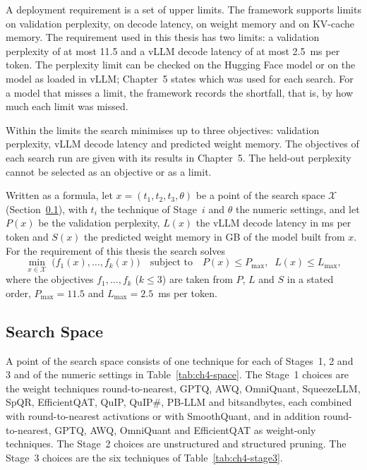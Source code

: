 \documentclass[
11pt, %
english, %
singlespacing, %
headsepline, %
]{MastersDoctoralThesis} %
\begin{document}
A deployment requirement is a set of upper limits. The framework supports limits on validation perplexity, on decode latency, on weight memory and on KV-cache memory. The requirement used in this thesis has two limits: a validation perplexity of at most 11.5 and a vLLM decode latency of at most 2.5~ms per token. The perplexity limit can be checked on the Hugging Face model or on the model as loaded in vLLM; Chapter~5 states which was used for each search. For a model that misses a limit, the framework records the shortfall, that is, by how much each limit was missed.

Within the limits the search minimises up to three objectives: validation perplexity, vLLM decode latency and predicted weight memory. The objectives of each search run are given with its results in Chapter~5. The held-out perplexity cannot be selected as an objective or as a limit.

Written as a formula, let $x = (t_1, t_2, t_3, \theta)$ be a point of the search space $\mathcal{X}$ (Section~\ref{sec:ch4-space}), with $t_i$ the technique of Stage~$i$ and $\theta$ the numeric settings, and let $P(x)$ be the validation perplexity, $L(x)$ the vLLM decode latency in ms per token and $S(x)$ the predicted weight memory in GB of the model built from $x$. For the requirement of this thesis the search solves
\begin{equation}
  \min_{x \in \mathcal{X}} \; \bigl(f_1(x), \ldots, f_k(x)\bigr) \quad \text{subject to} \quad P(x) \le P_{\max}, \;\; L(x) \le L_{\max},
  \label{eq:ch4-search}
\end{equation}
where the objectives $f_1, \ldots, f_k$ ($k \le 3$) are taken from $P$, $L$ and $S$ in a stated order, $P_{\max} = 11.5$ and $L_{\max} = 2.5$~ms per token.

\subsection{Search Space}
\label{sec:ch4-space}

A point of the search space consists of one technique for each of Stages~1, 2 and 3 and of the numeric settings in Table~\ref{tab:ch4-space}. The Stage~1 choices are the weight techniques round-to-nearest, GPTQ, AWQ, OmniQuant, SqueezeLLM, SpQR, EfficientQAT, QuIP, QuIP\#, PB-LLM and bitsandbytes, each combined with round-to-nearest activations or with SmoothQuant, and in addition round-to-nearest, GPTQ, AWQ, OmniQuant and EfficientQAT as weight-only techniques. The Stage~2 choices are unstructured and structured pruning. The Stage~3 choices are the six techniques of Table~\ref{tab:ch4-stage3}.
\end{document}
